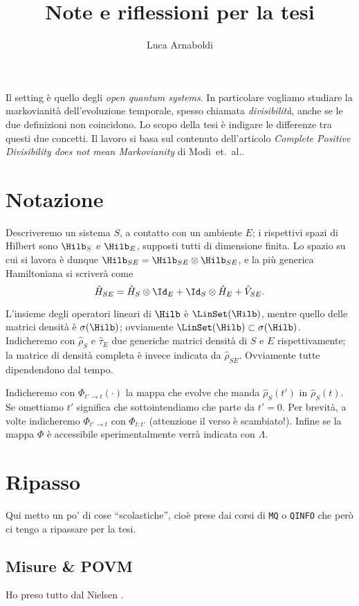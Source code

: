 \documentclass[a4]{article}
\title{Note e riflessioni per la tesi}
\author{Luca Arnaboldi}
\begin{document}
\maketitle
\tableofcontents
\vspace{6pt}
Il setting è quello degli \emph{open quantum systems}. In particolare vogliamo studiare
la markovianità dell'evoluzione temporale, spesso chiamata \emph{divisibilità}, anche se
le due definizioni non coincidono. Lo scopo della tesi è indigare le differenze tra questi
due concetti. Il lavoro si basa sul contenuto dell'articolo \emph{Complete Positive
Divisibility does not mean Markovianity} di Modi~et.~al.\cite{CPdoesnotimply}.

\section{Notazione}
Descriveremo un sistema \(S\), a contatto con un ambiente \(E\); i rispettivi spazi di
Hilbert sono \(\Hilb_S\) e \(\Hilb_E\), supposti tutti di dimensione finita. Lo spazio
su cui si lavora è dunque 
\(\Hilb_{SE} = \Hilb_{SE} \otimes \Hilb_{SE}\), e la più generica Hamiltoniana si
scriverà come
\[\hat{H}_{SE} = \hat{H}_S \otimes  \Id_E + \Id_S \otimes  \hat{H}_E + \hat{V}_{SE}.\]

L'insieme degli operatori lineari di \(\Hilb\) è \(\LinSet(\Hilb)\), mentre quello delle
matrici densità è \(\sigma(\Hilb)\); ovviamente \(\LinSet(\Hilb) \subset \sigma(\Hilb)\).
Indicheremo con \(\hat{\rho}_S\) e \(\hat{\tau}_E\) due generiche matrici densità di \(S\)
e \(E\) rispettivamente; la matrice di densità completa è invece indicata da \(\hat{\rho}_{SE}\).
Ovviamente tutte dipendendono dal tempo.


Indicheremo con \(\Phi_{t'\to t}(\cdot)\) la mappa che evolve che manda \(\hat{\rho}_S(t')\)
in \(\hat{\rho}_S(t)\). Se omettiamo \(t'\) significa che sottointendiamo che parte da \(t'=0\).
Per brevità, a volte indicheremo \(\Phi_{t'\to t}\) con \(\Phi_{t:t'}\) (attenzione il verso è scambiato!).
Infine se la mappa \(\Phi\) è accessibile sperimentalmente verrà indicata con
\(\Lambda\).

\section{Ripasso}
Qui metto un po' di cose ``scolastiche'', cioè prese dai corsi di \texttt{MQ} o \texttt{QINFO}
che però ci tengo a ripassare per la tesi.
\subsection{Misure \& POVM}
Ho preso tutto dal Nielsen \cite{nielsen2010quantum}.
\end{document}
